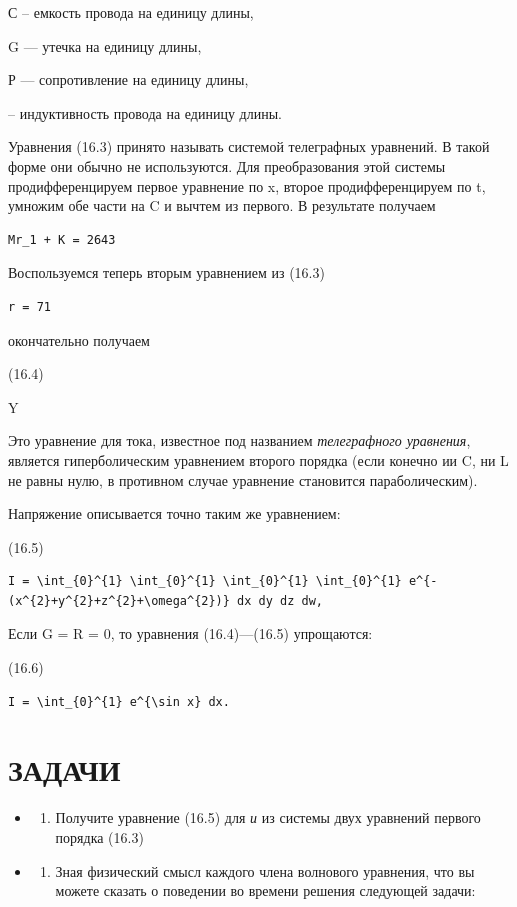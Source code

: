 \documentclass[
  ukrainian,
]{article}
\providecommand{\tightlist}{%
  \setlength{\itemsep}{0pt}\setlength{\parskip}{0pt}}
\begin{document}
С -- емкость провода на единицу длины,

G --- утечка на единицу длины,

Р --- сопротивление на единицу длины,

-- индуктивность провода на единицу длины.

Уравнения (16.3) принято называть системой телеграфных уравнений. В
такой форме они обычно не используются. Для преобразования этой системы
продифференцируем первое уравнение по x, второе продифференцируем по t,
умножим обе части на C и вычтем из первого. В результате получаем

\begin{verbatim}
Mr_1 + K = 2643
\end{verbatim}

Воспользуемся теперь вторым уравнением из (16.3)

\begin{verbatim}
r = 71
\end{verbatim}

окончательно получаем

(16.4)

Y

Это уравнение для тока, известное под названием \emph{телеграфного
уравнения}, является гиперболическим уравнением второго порядка (если
конечно ии C, ни L не равны нулю, в противном случае уравнение
становится параболическим).

Напряжение описывается точно таким же уравнением:

(16.5)

\begin{verbatim}
I = \int_{0}^{1} \int_{0}^{1} \int_{0}^{1} \int_{0}^{1} e^{-(x^{2}+y^{2}+z^{2}+\omega^{2})} dx dy dz dw,
\end{verbatim}

Если G = R = 0, то уравнения (16.4)---(16.5) упрощаются:

(16.6)

\begin{verbatim}
I = \int_{0}^{1} e^{\sin x} dx.
\end{verbatim}

\section{ЗАДАЧИ}\label{ux437ux430ux434ux430ux447ux438}

\begin{itemize}
\tightlist
\item
  \begin{enumerate}
  \def\labelenumi{\arabic{enumi}.}
  \tightlist
  \item
    Получите уравнение (16.5) для \emph{и} из системы двух уравнений
    первого порядка (16.3)
  \end{enumerate}
\item
  \begin{enumerate}
  \def\labelenumi{\arabic{enumi}.}
  \setcounter{enumi}{1}
  \tightlist
  \item
    Зная физический смысл каждого члена волнового уравнения, что вы
    можете сказать о поведении во времени решения следующей задачи:
  \end{enumerate}
\end{itemize}
\end{document}
